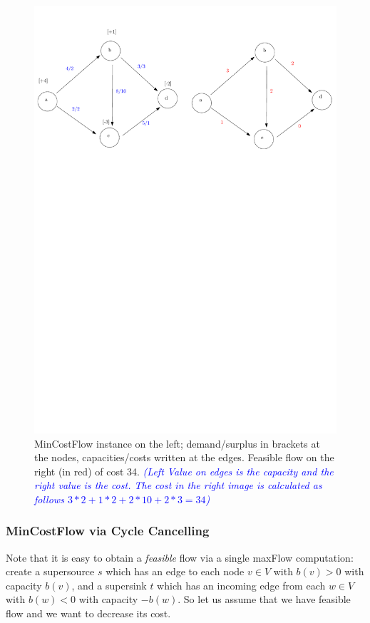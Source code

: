 \documentclass{article}
\begin{document}
\begin{figure}
\includegraphics[width=\textwidth]{Figs/minCostFlow-Ex1.pdf}
\caption{MinCostFlow instance on the left; demand/surplus in brackets at the nodes, capacities/costs written at the edges. Feasible flow on the right (in red) of cost 34. \textcolor{blue}{\emph{(Left Value on edges is the capacity and the right value is the cost. The cost in the right image is calculated as follows $3*2+1*2+2*10+2*3 = 34$) }}}\label{fig:minCostFlow-Ex1} 
\end{figure}

\subsubsection{MinCostFlow via Cycle Cancelling}
Note that it is easy to obtain a \emph{feasible} flow via a single maxFlow computation: create a supersource $s$ which has an edge to each node $v\in V$ with $b(v)>0$ with capacity $b(v)$, and a supersink $t$ which has an incoming edge from each $w\in V$ with $b(w)<0$ with capacity $-b(w)$.
So let us assume that we have feasible flow and we want to decrease its cost.
\end{document}
